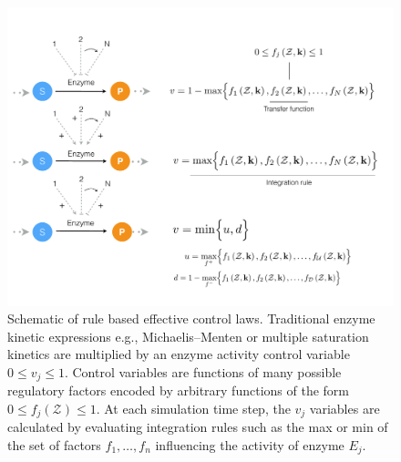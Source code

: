 \documentclass[12pt]{article}
\begin{document}
\begin{figure}
\centering
\includegraphics[width=1.0\textwidth]{./figs/Figure-2-ControlSchematic.pdf}
\caption{Schematic of rule based effective control laws. 
Traditional enzyme kinetic expressions e.g., Michaelis–Menten or multiple saturation kinetics are multiplied by an enzyme activity control variable $0 \leq v_{j} \leq 1 $. 
Control variables are functions of many possible regulatory factors encoded by arbitrary functions of the form $0\leq f_{j}\left(\mathcal{Z}\right)\leq 1$.
At each simulation time step, the $v_{j}$ variables are calculated by evaluating integration rules such as the max or min of the set of factors $f_{1},\hdots,f_{n}$ 
influencing the activity of enzyme $E_{j}$. }\label{fig-control-schematic}
\end{figure}

\clearpage
\end{document}
